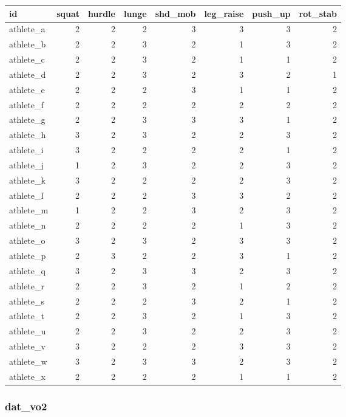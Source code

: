 \documentclass[
]{book}
\begin{document}
\begin{tabular}{l|r|r|r|r|r|r|r}
\hline
id & squat & hurdle & lunge & shd\_mob & leg\_raise & push\_up & rot\_stab\\
\hline
athlete\_a & 2 & 2 & 2 & 3 & 3 & 3 & 2\\
\hline
athlete\_b & 2 & 2 & 3 & 2 & 1 & 3 & 2\\
\hline
athlete\_c & 2 & 2 & 3 & 2 & 1 & 1 & 2\\
\hline
athlete\_d & 2 & 2 & 3 & 2 & 3 & 2 & 1\\
\hline
athlete\_e & 2 & 2 & 2 & 3 & 1 & 1 & 2\\
\hline
athlete\_f & 2 & 2 & 2 & 2 & 2 & 2 & 2\\
\hline
athlete\_g & 2 & 2 & 3 & 3 & 3 & 1 & 2\\
\hline
athlete\_h & 3 & 2 & 3 & 2 & 2 & 3 & 2\\
\hline
athlete\_i & 3 & 2 & 2 & 2 & 2 & 1 & 2\\
\hline
athlete\_j & 1 & 2 & 3 & 2 & 2 & 3 & 2\\
\hline
athlete\_k & 3 & 2 & 2 & 2 & 2 & 3 & 2\\
\hline
athlete\_l & 2 & 2 & 2 & 3 & 3 & 2 & 2\\
\hline
athlete\_m & 1 & 2 & 2 & 3 & 2 & 3 & 2\\
\hline
athlete\_n & 2 & 2 & 2 & 2 & 1 & 3 & 2\\
\hline
athlete\_o & 3 & 2 & 3 & 2 & 3 & 3 & 2\\
\hline
athlete\_p & 2 & 3 & 2 & 2 & 3 & 1 & 2\\
\hline
athlete\_q & 3 & 2 & 3 & 3 & 2 & 3 & 2\\
\hline
athlete\_r & 2 & 2 & 3 & 2 & 1 & 2 & 2\\
\hline
athlete\_s & 2 & 2 & 2 & 3 & 2 & 1 & 2\\
\hline
athlete\_t & 2 & 2 & 3 & 2 & 1 & 3 & 2\\
\hline
athlete\_u & 2 & 2 & 3 & 2 & 2 & 3 & 2\\
\hline
athlete\_v & 3 & 2 & 2 & 2 & 3 & 3 & 2\\
\hline
athlete\_w & 3 & 2 & 3 & 3 & 2 & 3 & 2\\
\hline
athlete\_x & 2 & 2 & 2 & 2 & 1 & 1 & 2\\
\hline
\end{tabular}

\hypertarget{dat_vo2}{%
\subsubsection{dat\_vo2}\label{dat_vo2}}
\end{document}
